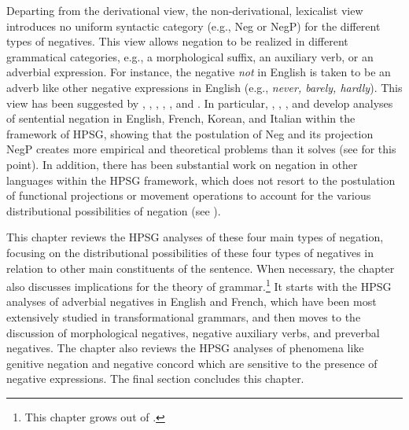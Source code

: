\documentclass[output=paper
	        ,collection
	        ,collectionchapter
 	        ,biblatex
                ,babelshorthands
                ,newtxmath
                ,draftmode
                ,colorlinks, citecolor=brown
]{langscibook}
\begin{document}
{Departing from the derivational view, the non-derivational, lexicalist view
introduces no uniform syntactic category (e.g., Neg or NegP) for the different types of negatives. This view allows negation to be realized in different grammatical categories, e.g., a morphological suffix, an auxiliary verb, or an adverbial expression. For instance, the negative \emph{not} in English is taken to be an adverb like other negative expressions in English (e.g., \textit{never, barely, hardly}). This view has been suggested by \citet{Jackendoff:72}, \citet{Baker:91}, \citet{Ernst:92}, \citet{AG:97}, \citet{Kim:00}, and \citet{Warner2000a-u}. In particular,
\citet{KS:96}, \citet{AG:97}, \citet{Kim:00}, and \citet{KS:02} develop analyses of sentential negation in English, French, Korean, and Italian within the framework of HPSG, showing that the postulation of Neg and its projection NegP creates more empirical and theoretical problems than it solves (see \citealt{Newmeyer:2006} for this point).
In addition, there has been substantial work on negation in other languages within the HPSG framework, which
does not resort to the postulation of functional projections or movement operations to account for the various distributional possibilities
of negation (see \citealt{PK:99, BJ:00, Prz:00, Kupsc:02, Swart:02, Borsley:05, Crysmann:10, Bender:13}).

This chapter reviews the HPSG analyses of these four main types of negation,
focusing on the distributional possibilities of these four types of negatives in
relation to other main constituents of the sentence. When
necessary, the chapter also discusses implications for
the theory of grammar.\footnote{This chapter grows out of \citet{Kim:00,kim:18}.}
It starts with the HPSG analyses of adverbial negatives in English and French, which have been most extensively studied in transformational grammars,
and then moves to the discussion of morphological
negatives, negative auxiliary verbs, and preverbal negatives. The chapter
also reviews the HPSG analyses of phenomena like genitive negation and
negative concord which are sensitive to the presence of negative expressions. The
final section concludes this chapter.


}
\end{document}

